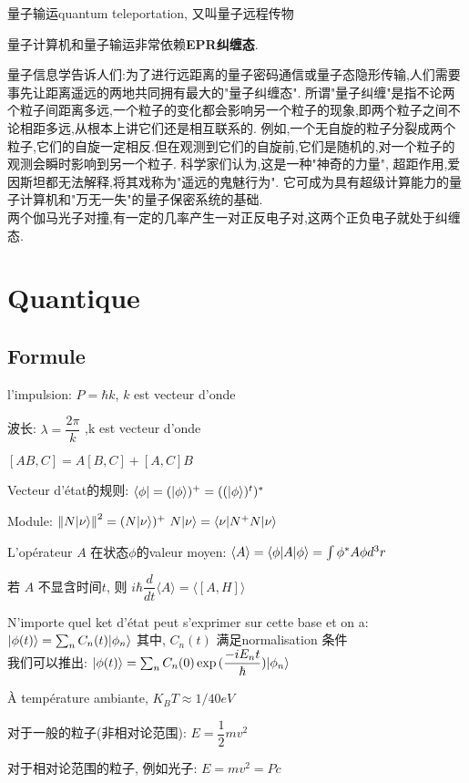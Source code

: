 \documentclass{article}
\begin{document}
量子输运quantum teleportation, 又叫量子远程传物

量子计算机和量子输运非常依赖\textbf{EPR纠缠态}.

量子信息学告诉人们:为了进行远距离的量子密码通信或量子态隐形传输,人们需要事先让距离遥远的两地共同拥有最大的"量子纠缠态".
所谓"量子纠缠"是指不论两个粒子间距离多远,一个粒子的变化都会影响另一个粒子的现象,即两个粒子之间不论相距多远,从根本上讲它们还是相互联系的.
例如,一个无自旋的粒子分裂成两个粒子,它们的自旋一定相反.但在观测到它们的自旋前,它们是随机的,对一个粒子的观测会瞬时影响到另一个粒子.
科学家们认为,这是一种"神奇的力量", 超距作用,爱因斯坦都无法解释,将其戏称为"遥远的鬼魅行为".
它可成为具有超级计算能力的量子计算机和"万无一失"的量子保密系统的基础.\\
两个伽马光子对撞,有一定的几率产生一对正反电子对,这两个正负电子就处于纠缠态.
\chapter{Quantique}
\section{Formule}
l'impulsion: $P = \hbar k$, $k$ est vecteur d'onde

波长: $\lambda = \dfrac{2\pi}{k}$ ,k est vecteur d'onde

$[AB,C] = A[B,C] + [A,C]B$

Vecteur d'\'etat的规则: $\langle \phi| = (|\phi\rangle)^+ = ((|\phi\rangle)^t)^*$

Module: $\left\Vert N|\nu\rangle\right\Vert^2 = (N |\nu\rangle)^+ \ N |\nu\rangle = \langle\nu|N^+ N|\nu\rangle$

L'op\'erateur $A$ 在状态$\phi$的valeur moyen: $\langle A \rangle = \langle\phi|A|\phi\rangle = \int \phi^* A \phi d^3 r$

若 $A$ 不显含时间$t$, 则 $i\hbar \dfrac{d}{dt}\langle A \rangle = \langle [A,H] \rangle$

\bigskip
N'importe quel ket d'\'etat peut s'exprimer sur cette base et on a: $|\phi(t)\rangle = \sum_n C_n(t) |\phi_n\rangle$ 其中, $C_n(t)$ 满足normalisation 条件 \\
我们可以推出: $|\phi(t)\rangle = \sum_n C_n(0) \exp{(\dfrac{-i E_n t}{\hbar})} |\phi_n\rangle$
\bigskip

\`A temp\'erature ambiante, $K_B T \approx 1/40 eV$

对于一般的粒子(非相对论范围): $E = \dfrac{1}{2} mv^2$

对于相对论范围的粒子, 例如光子: $E = mv^2 = Pc$
\end{document}

